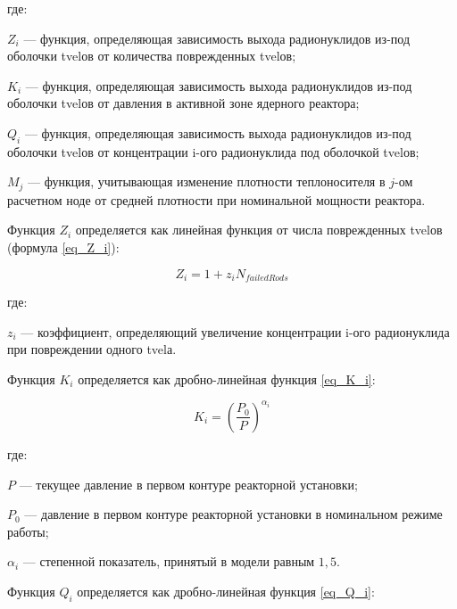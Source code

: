 где:
\begin{description}
    \item $Z_{i}$ --- функция, определяющая зависимость выхода радионуклидов из-под оболочки \ac{tvel}ов от количества 
        поврежденных \ac{tvel}ов;
    \item $K_{i}$ --- функция, определяющая зависимость выхода радионуклидов из-под оболочки \ac{tvel}ов от давления в 
        активной зоне ядерного реактора;
    \item $Q_{i}$ --- функция, определяющая зависимость выхода радионуклидов из-под оболочки \ac{tvel}ов от концентрации 
        i-ого радионуклида под оболочкой \ac{tvel}ов;
    \item $M_{j}$ --- функция, учитывающая изменение плотности теплоносителя в $j$-ом расчетном ноде от средней 
        плотности при номинальной мощности реактора.
\end{description}

Функция $Z_{i}$ определяется как линейная функция от числа поврежденных \ac{tvel}ов (формула \ref{eq_Z_i}):

\begin{equation}
    \label{eq_Z_i}
    Z_{i} = 1 + z_{i}N_{failedRods}
\end{equation}

где:
\begin{description}
    \item $z_{i}$ --- коэффициент, определяющий увеличение концентрации  i-ого радионуклида при повреждении одного 
        \ac{tvel}а.
\end{description}

Функция $K_{i}$ определяется как дробно-линейная функция \ref{eq_K_i}:

\begin{equation}
    \label{eq_K_i}
    K_{i} = (\frac{P_{0}}{P})^{\alpha_{i}}
\end{equation}

где:
\begin{description}
    \item $P$ --- текущее давление в первом контуре реакторной установки;
    \item $P_{0}$ --- давление в первом контуре реакторной установки в номинальном режиме работы;
    \item $\alpha_{i}$ --- степенной показатель, принятый в модели равным $1,5$.
\end{description}

Функция $Q_{i}$ определяется как дробно-линейная функция \ref{eq_Q_i}:

